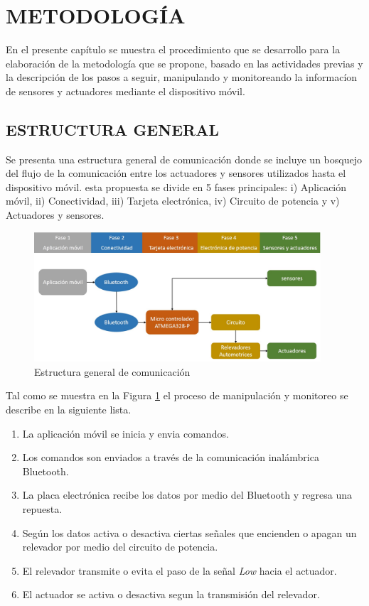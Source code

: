 \section{METODOLOGÍA}
En el presente capítulo se muestra el procedimiento que se desarrollo para la elaboración de la metodología que se propone, basado en las actividades previas y la descripción de los pasos a seguir, manipulando y monitoreando la informacíon de sensores y actuadores mediante el dispositivo móvil.

\subsection{ESTRUCTURA GENERAL}

Se presenta una estructura general de comunicación donde se incluye un bosquejo del flujo de la comunicación entre los actuadores y sensores utilizados hasta el dispositivo móvil. esta propuesta se divide en 5 fases principales: i) Aplicación móvil, ii) Conectividad, iii) Tarjeta electrónica, iv) Circuito de potencia y v) Actuadores y sensores.

%
\begin{figure}[H]
\centering
\includegraphics[width=0.95\textwidth]{metodologia/fig_1.jpg}
\caption{Estructura general de comunicación}
\label{Meuno}
\end{figure}
%

 
 Tal como se muestra en la Figura \ref{Meuno} el proceso de manipulación y monitoreo se describe en la siguiente lista.
 \begin{enumerate}
\item La aplicación móvil se inicia y envia comandos.
\item Los comandos son enviados a través de la comunicación inalámbrica Bluetooth.
\item La placa electrónica recibe los datos por medio del Bluetooth y regresa una repuesta.
\item Según los datos activa o desactiva ciertas señales que encienden o apagan un relevador por medio del circuito de potencia.
\item El relevador transmite o evita el paso de la señal \textit{Low} hacia el actuador.
\item El actuador se activa o desactiva segun la transmisión del relevador.

\end{enumerate}


